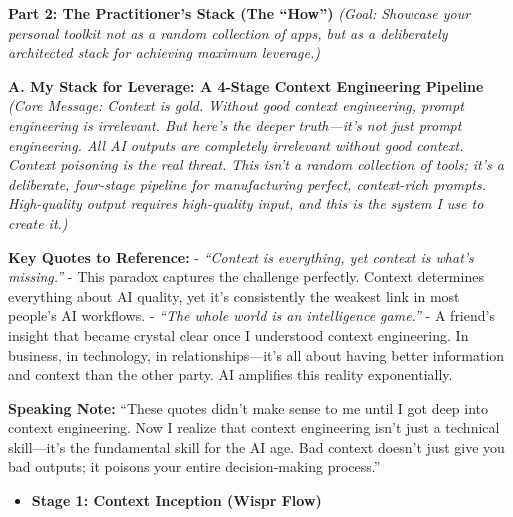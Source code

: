 \documentclass[
  ignorenonframetext,
  aspectratio=169,
]{beamer}
\providecommand{\tightlist}{%
  \setlength{\itemsep}{0pt}\setlength{\parskip}{0pt}}
\begin{document}
\begin{frame}{\textbf{Part 2: The Practitioner's Stack (The ``How'')}}
\label{part-2-the-practitioners-stack-the-how}
\emph{(Goal: Showcase your personal toolkit not as a random collection
of apps, but as a deliberately architected stack for achieving maximum
leverage.)}

\begin{block}{\textbf{A. My Stack for Leverage: A 4-Stage Context
Engineering Pipeline}}
\label{a.-my-stack-for-leverage-a-4-stage-context-engineering-pipeline}
\emph{(Core Message: Context is gold. Without good context engineering,
prompt engineering is irrelevant. But here's the deeper truth---it's not
just prompt engineering. All AI outputs are completely irrelevant
without good context. Context poisoning is the real threat. This isn't a
random collection of tools; it's a deliberate, four-stage pipeline for
manufacturing perfect, context-rich prompts. High-quality output
requires high-quality input, and this is the system I use to create
it.)}

\textbf{Key Quotes to Reference:} - \emph{``Context is everything, yet
context is what's missing.''} - This paradox captures the challenge
perfectly. Context determines everything about AI quality, yet it's
consistently the weakest link in most people's AI workflows. -
\emph{``The whole world is an intelligence game.''} - A friend's insight
that became crystal clear once I understood context engineering. In
business, in technology, in relationships---it's all about having better
information and context than the other party. AI amplifies this reality
exponentially.

\textbf{Speaking Note:} ``These quotes didn't make sense to me until I
got deep into context engineering. Now I realize that context
engineering isn't just a technical skill---it's the fundamental skill
for the AI age. Bad context doesn't just give you bad outputs; it
poisons your entire decision-making process.''

\begin{itemize}
\tightlist
\item
  \textbf{Stage 1: Context Inception (Wispr Flow)}


\end{itemize}
\end{block}
\end{frame}
\end{document}
